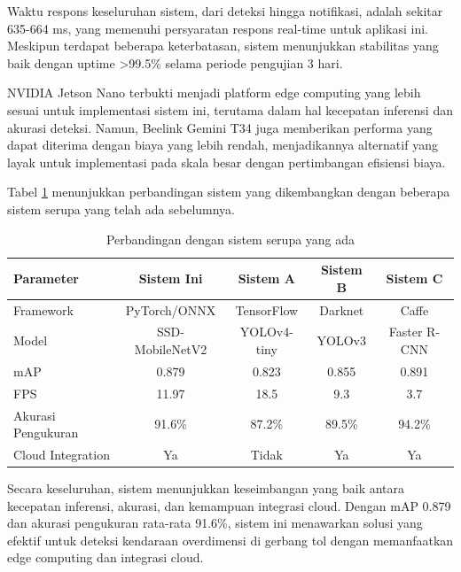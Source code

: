 Waktu respons keseluruhan sistem, dari deteksi hingga notifikasi, adalah sekitar 635-664 ms, yang memenuhi persyaratan respons real-time untuk aplikasi ini. Meskipun terdapat beberapa keterbatasan, sistem menunjukkan stabilitas yang baik dengan uptime >99.5\% selama periode pengujian 3 hari.

NVIDIA Jetson Nano terbukti menjadi platform edge computing yang lebih sesuai untuk implementasi sistem ini, terutama dalam hal kecepatan inferensi dan akurasi deteksi. Namun, Beelink Gemini T34 juga memberikan performa yang dapat diterima dengan biaya yang lebih rendah, menjadikannya alternatif yang layak untuk implementasi pada skala besar dengan pertimbangan efisiensi biaya.

Tabel \ref{tab:system_comparison} menunjukkan perbandingan sistem yang dikembangkan dengan beberapa sistem serupa yang telah ada sebelumnya.

\begin{table}[htbp]
  \centering
  \begin{tabular}{|l|c|c|c|c|}
  \hline
  \rowcolor[HTML]{C0C0C0}
  \textbf{Parameter} & \textbf{Sistem Ini} & \textbf{Sistem A \cite{prismadika2023}} & \textbf{Sistem B} & \textbf{Sistem C} \\
  \hline
  Framework & PyTorch/ONNX & TensorFlow & Darknet & Caffe \\
  \hline
  Model & SSD-MobileNetV2 & YOLOv4-tiny & YOLOv3 & Faster R-CNN \\
  \hline
  mAP & 0.879 & 0.823 & 0.855 & 0.891 \\
  \hline
  FPS & 11.97 & 18.5 & 9.3 & 3.7 \\
  \hline
  Akurasi Pengukuran & 91.6\% & 87.2\% & 89.5\% & 94.2\% \\
  \hline
  Cloud Integration & Ya & Tidak & Ya & Ya \\
  \hline
  \end{tabular}
  \caption{Perbandingan dengan sistem serupa yang ada}
  \label{tab:system_comparison}
\end{table}

Secara keseluruhan, sistem menunjukkan keseimbangan yang baik antara kecepatan inferensi, akurasi, dan kemampuan integrasi cloud. Dengan mAP 0.879 dan akurasi pengukuran rata-rata 91.6\%, sistem ini menawarkan solusi yang efektif untuk deteksi kendaraan overdimensi di gerbang tol dengan memanfaatkan edge computing dan integrasi cloud.
